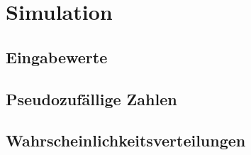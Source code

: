 \section{Simulation}

\subsection{Eingabewerte}

\subsection{Pseudozufällige Zahlen}

\subsection{Wahrscheinlichkeitsverteilungen}
